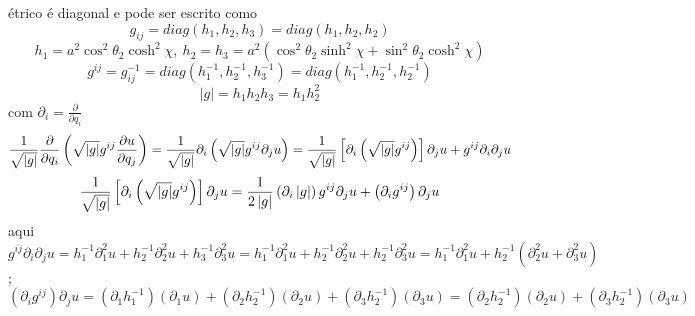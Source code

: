 \documentclass[a4paper,12pt]{article}
\begin{document}
\'{e}trico \'{e} diagonal e pode ser escrito como%
\begin{equation*}
g_{ij}=diag\left( h_{1},h_{2},h_{3}\right) =diag\left(
h_{1},h_{2},h_{2}\right) 
\end{equation*}%
\begin{equation*}
h_{1}=a^{2}\cos ^{2}\theta _{2}\cosh ^{2}\chi ,\ h_{2}=h_{3}=a^{2}\left(
\cos ^{2}\theta _{2}\sinh ^{2}\chi +\sin ^{2}\theta _{2}\cosh ^{2}\chi
\right) 
\end{equation*}%
\begin{equation*}
g^{ij}=g_{ij}^{-1}=diag\left( h_{1}^{-1},h_{2}^{-1},h_{3}^{-1}\right)
=diag\left( h_{1}^{-1},h_{2}^{-1},h_{2}^{-1}\right) 
\end{equation*}%
\begin{equation*}
\left\vert g\right\vert =h_{1}h_{2}h_{3}=h_{1}h_{2}^{2}
\end{equation*}%
com $\partial _{i}=\frac{\partial }{\partial q_{i}}$%
\begin{equation*}
\frac{1}{\sqrt{\left\vert g\right\vert }}\frac{\partial }{\partial q_{i}}%
\left( \sqrt{\left\vert g\right\vert }g^{ij}\frac{\partial u}{\partial q_{j}}%
\right) =\frac{1}{\sqrt{\left\vert g\right\vert }}\partial _{i}\left( \sqrt{%
\left\vert g\right\vert }g^{ij}\partial _{j}u\right) =\frac{1}{\sqrt{%
\left\vert g\right\vert }}\left[ \partial _{i}\left( \sqrt{\left\vert
g\right\vert }g^{ij}\right) \right] \partial _{j}u+g^{ij}\partial
_{i}\partial _{j}u
\end{equation*}%
\begin{equation*}
\frac{1}{\sqrt{\left\vert g\right\vert }}\left[ \partial _{i}\left( \sqrt{%
\left\vert g\right\vert }g^{ij}\right) \right] \partial _{j}u=\frac{1}{%
2\left\vert g\right\vert }\left( \partial _{i}\left\vert g\right\vert
\right) g^{ij}\partial _{j}u+\left( \partial _{i}g^{ij}\right) \partial _{j}u
\end{equation*}%
aqui%
\begin{equation*}
g^{ij}\partial _{i}\partial _{j}u=h_{1}^{-1}\partial
_{1}^{2}u+h_{2}^{-1}\partial _{2}^{2}u+h_{3}^{-1}\partial
_{3}^{2}u=h_{1}^{-1}\partial _{1}^{2}u+h_{2}^{-1}\partial
_{2}^{2}u+h_{2}^{-1}\partial _{3}^{2}u=h_{1}^{-1}\partial
_{1}^{2}u+h_{2}^{-1}\left( \partial _{2}^{2}u+\partial _{3}^{2}u\right) 
\end{equation*}%
;%
\begin{equation*}
\left( \partial _{i}g^{ij}\right) \partial _{j}u=\left( \partial
_{1}h_{1}^{-1}\right) \left( \partial _{1}u\right) +\left( \partial
_{2}h_{2}^{-1}\right) \left( \partial _{2}u\right) +\left( \partial
_{3}h_{2}^{-1}\right) \left( \partial _{3}u\right) =\left( \partial
_{2}h_{2}^{-1}\right) \left( \partial _{2}u\right) +\left( \partial
_{3}h_{2}^{-1}\right) \left( \partial _{3}u\right) 
\end{equation*}%
\end{document}
